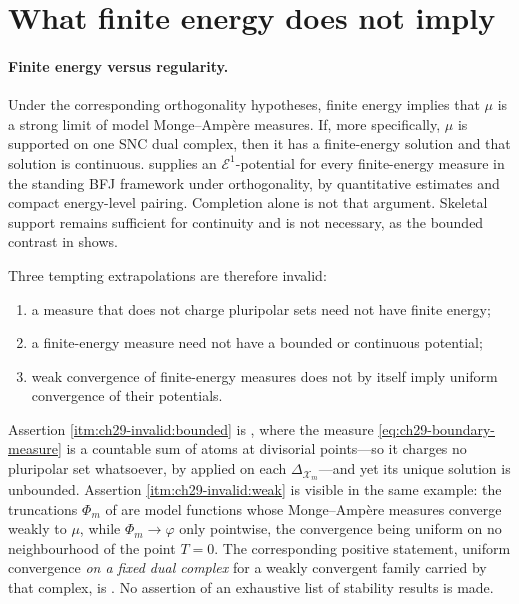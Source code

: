 \section{What finite energy does not imply}

\paragraph{Finite energy versus regularity.}
Under the corresponding orthogonality hypotheses, finite energy implies
that $\mu$ is a strong limit of model Monge--Amp\`ere measures.  If,
more specifically, $\mu$ is supported on one SNC dual complex, then it
has a finite-energy solution and that solution is continuous.   supplies an
$\mathcal E^1$-potential for every finite-energy measure in the standing
BFJ framework under orthogonality, by quantitative estimates and
compact energy-level pairing.  Completion alone is not that argument.
Skeletal support remains sufficient for continuity and is not necessary,
as the bounded contrast in  shows.

Three tempting extrapolations are therefore invalid:
\begin{enumerate}
\item\label{itm:ch29-invalid:polar}
      a measure that does not charge pluripolar sets need not have finite
      energy;
\item\label{itm:ch29-invalid:bounded}
      a finite-energy measure need not have a bounded or continuous
      potential;
\item\label{itm:ch29-invalid:weak}
      weak convergence of finite-energy measures does not by itself imply
      uniform convergence of their potentials.
\end{enumerate}

Assertion \cref{itm:ch29-invalid:bounded} is
, where the measure
\eqref{eq:ch29-boundary-measure} is a countable sum of atoms at divisorial
points---so it charges no pluripolar set whatsoever, by
 applied on each
$\Delta_{\mathcal X_m}$---and yet its unique solution is unbounded.
Assertion \cref{itm:ch29-invalid:weak} is visible in the same example: the
truncations $\Phi_m$ of  are model
functions whose Monge--Amp\`ere measures converge weakly to $\mu$, while
$\Phi_m\to\varphi$ only pointwise, the convergence being uniform on no
neighbourhood of the point $T=0$.  The corresponding positive statement,
uniform convergence \emph{on a fixed dual complex} for a weakly convergent
family carried by that complex, is
.  No assertion of an exhaustive
list of stability results is made.

